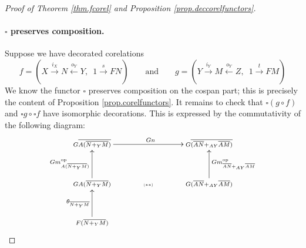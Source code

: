 \begin{proof}[Proof of Theorem \ref{thm.fcorel} and Proposition
  \ref{prop.deccorelfunctors}]
  \paragraph{$\square$ preserves composition.} Suppose we have decorated corelations
  \[
    f=(X \stackrel{i_X}{\longrightarrow} N \stackrel{o_Y}{\longleftarrow} Y,
    \enspace 1 \stackrel{s}{\to} FN)
    \qquad
    \mbox{and}
    \qquad 
    g=(Y \stackrel{i_Y}{\longrightarrow} M \stackrel{o_Y}{\longleftarrow} Z,
    \enspace 1 \stackrel{t}{\to} FM)
  \]
  We know the functor $\square$ preserves composition on the cospan part; this
  is precisely the content of Proposition \ref{prop.corelfunctors}. It remains to
  check that $\square( g \circ f)$ and $\square g \circ \square f$ have
  isomorphic decorations. This is expressed by the commutativity of the
  following diagram:
  \[
    \xymatrixrowsep{1.1pc}
    \xymatrixcolsep{.6pc}
    \xymatrix{
      \scriptstyle G\overline{A(\overline{N+_YM})} \ar[rrrrrr]^{Gn} &&&&&&
      \scriptstyle G\overline{(\overline{AN}+_{AY}\overline{AM})}\\
      \\
      \scriptstyle GA(\overline{N+_YM}) \ar[uu]^{Gm^\opp_{A(\overline{N+_YM})}} &&&
      \textsc{\tiny($\ast\ast$)} &&& 
      \scriptstyle G(\overline{AN}+_{AY}\overline{AM})
      \ar[uu]_{Gm^\opp_{\overline{AN}+_{AY}\overline{AM}}} \\
      \\
      \scriptstyle F(\overline{N+_YM}) \ar[uu]^{\theta_{\overline{N+_YM}}} &
}\]
\end{proof}
